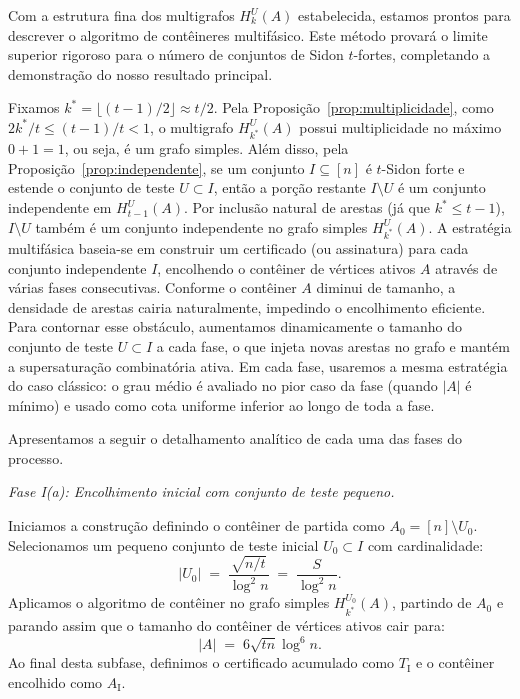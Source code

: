 \documentclass[reqno,a4paper,12pt]{amsart}
\begin{document}
Com a estrutura fina dos multigrafos $H_k^U(A)$ estabelecida, estamos prontos para descrever o algoritmo de contêineres multifásico. Este método provará o limite superior rigoroso para o número de conjuntos de Sidon $t$-fortes, completando a demonstração do nosso resultado principal.

Fixamos $k^* = \lfloor (t-1)/2 \rfloor \approx t/2$. Pela Proposição~\ref{prop:multiplicidade}, como $2k^*/t \leq (t-1)/t < 1$, o multigrafo $H_{k^*}^U(A)$ possui multiplicidade no máximo $0 + 1 = 1$, ou seja, é um grafo simples. Além disso, pela Proposição~\ref{prop:independente}, se um conjunto $I \subseteq [n]$ é $t$-Sidon forte e estende o conjunto de teste $U \subset I$, então a porção restante $I \setminus U$ é um conjunto independente em $H_{t-1}^U(A)$. Por inclusão natural de arestas (já que $k^* \leq t-1$), $I \setminus U$ também é um conjunto independente no grafo simples $H_{k^*}^U(A)$. A estratégia multifásica baseia-se em construir um certificado (ou assinatura) para cada conjunto independente $I$, encolhendo o contêiner de vértices ativos $A$ através de várias fases consecutivas. Conforme o contêiner $A$ diminui de tamanho, a densidade de arestas cairia naturalmente, impedindo o encolhimento eficiente. Para contornar esse obstáculo, aumentamos dinamicamente o tamanho do conjunto de teste $U \subset I$ a cada fase, o que injeta novas arestas no grafo e mantém a supersaturação combinatória ativa. Em cada fase, usaremos a mesma estratégia do caso clássico: o grau médio é avaliado no pior caso da fase (quando $|A|$ é mínimo) e usado como cota uniforme inferior ao longo de toda a fase.

Apresentamos a seguir o detalhamento analítico de cada uma das fases do processo.

\medskip

\noindent\textit{Fase I(a): Encolhimento inicial com conjunto de teste pequeno.}

Iniciamos a construção definindo o contêiner de partida como $A_0 = [n] \setminus U_0$. Selecionamos um pequeno conjunto de teste inicial $U_0 \subset I$ com cardinalidade:
\[
  |U_0| \;=\; \frac{\sqrt{n/t}}{\log^2 n} \;=\; \frac{S}{\log^2 n}.
\]
Aplicamos o algoritmo de contêiner no grafo simples $H_{k^*}^{U_0}(A)$, partindo de $A_0$ e parando assim que o tamanho do contêiner de vértices ativos cair para:
\[
  |A| \;=\; 6\sqrt{t n}\log^6 n.
\]
Ao final desta subfase, definimos o certificado acumulado como $T_{\mathrm{I}}$ e o contêiner encolhido como $A_{\mathrm{I}}$.
\end{document}
